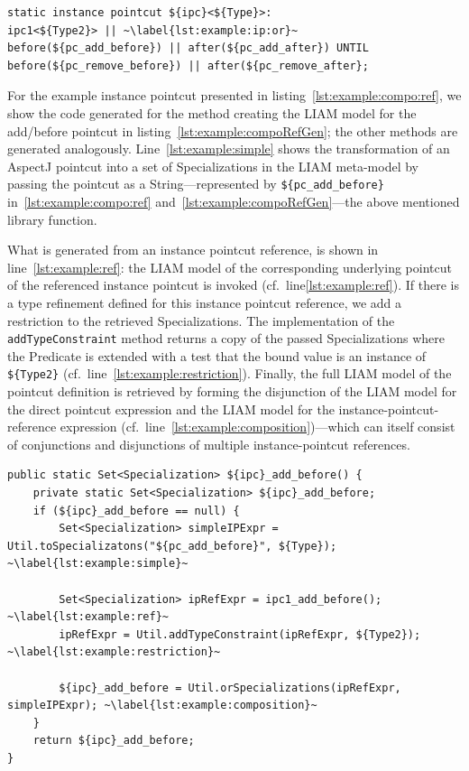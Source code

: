 \documentclass{acm_proc_article-sp}
\begin{document}
\begin{lstlisting}[caption={Example of an instance pointcut using composition and type refinement}, label=lst:example:compo:ref,moreemph=instance]
static instance pointcut ${ipc}<${Type}>:
ipc1<${Type2}> || ~\label{lst:example:ip:or}~
before(${pc_add_before}) || after(${pc_add_after}) UNTIL 
before(${pc_remove_before}) || after(${pc_remove_after};
\end{lstlisting}

For the example instance pointcut presented in listing~\ref{lst:example:compo:ref}, we show the code generated for the method creating the LIAM model for the add/before pointcut in listing~\ref{lst:example:compoRefGen}; the other methods are generated analogously.
Line~\ref{lst:example:simple} shows the transformation of an AspectJ pointcut into a set of Specializations in the LIAM meta-model by passing the pointcut as a String---represented by \lstinline!${pc_add_before}! in~\ref{lst:example:compo:ref} and~\ref{lst:example:compoRefGen}---the above mentioned library function.

What is generated from an instance pointcut reference, is shown in line~\ref{lst:example:ref}: the LIAM model of the corresponding underlying pointcut of the referenced instance pointcut is invoked (cf.~line\ref{lst:example:ref}).
If there is a type refinement defined for this instance pointcut reference, we add a restriction to the retrieved Specializations.
The implementation of the \lstinline!addTypeConstraint! method returns a copy of the passed Specializations where the Predicate is extended with a test that the bound value is an instance of \lstinline!${Type2}! (cf.\ line~\ref{lst:example:restriction}).
Finally, the full LIAM model of the pointcut definition is retrieved by forming the disjunction of the LIAM model for the direct pointcut expression and the LIAM model for the instance-pointcut-reference expression (cf.\ line~\ref{lst:example:composition})---which can itself consist of conjunctions and disjunctions of multiple instance-pointcut references.

\begin{lstlisting}[caption={Generated code for creating the LIAM model for the add/before pointcut of the example instance pointcut.},label={lst:example:compoRefGen}]
public static Set<Specialization> ${ipc}_add_before() {
	private static Set<Specialization> ${ipc}_add_before;
	if (${ipc}_add_before == null) {
		Set<Specialization> simpleIPExpr = Util.toSpecializatons("${pc_add_before}", ${Type}); ~\label{lst:example:simple}~
		
		Set<Specialization> ipRefExpr = ipc1_add_before(); ~\label{lst:example:ref}~
		ipRefExpr = Util.addTypeConstraint(ipRefExpr, ${Type2}); ~\label{lst:example:restriction}~
		
		${ipc}_add_before = Util.orSpecializations(ipRefExpr, simpleIPExpr); ~\label{lst:example:composition}~
	}
	return ${ipc}_add_before;
}
\end{lstlisting}
\end{document}
